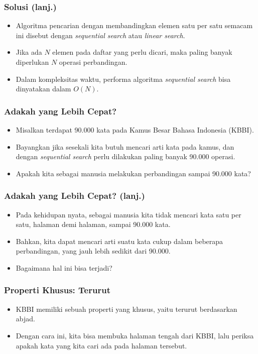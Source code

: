 \begin{frame}
\frametitle{Solusi (lanj.)}
\begin{itemize}
  \item Algoritma pencarian dengan membandingkan elemen satu per satu semacam ini disebut dengan \alert{\textit{sequential search}} atau \alert{\textit{linear search}}.
  \item Jika ada $N$ elemen pada daftar yang perlu dicari, maka paling banyak diperlukan $N$ operasi perbandingan.
  \item Dalam kompleksitas waktu, performa algoritma \textit{sequential search} bisa dinyatakan dalam $O(N)$.
\end{itemize}
\end{frame}

\begin{frame}
\frametitle{Adakah yang Lebih Cepat?}
\begin{itemize}
  \item Misalkan terdapat 90.000 kata pada Kamus Besar Bahasa Indonesia (KBBI).
  \item Bayangkan jika sesekali kita butuh mencari arti kata pada kamus, dan dengan \textit{sequential search} perlu dilakukan paling banyak 90.000 operasi.
  \item Apakah kita sebagai manusia melakukan perbandingan sampai 90.000 kata?
\end{itemize}
\end{frame}

\begin{frame}
\frametitle{Adakah yang Lebih Cepat? (lanj.)}
\begin{itemize}
  \item Pada kehidupan nyata, sebagai manusia kita tidak mencari kata satu per satu, halaman demi halaman, sampai 90.000 kata.
  \item Bahkan, kita dapat mencari arti suatu kata cukup dalam beberapa perbandingan, yang jauh lebih sedikit dari 90.000.
  \item Bagaimana hal ini bisa terjadi?
\end{itemize}
\end{frame}

\begin{frame}
\frametitle{Properti Khusus: Terurut}
\begin{itemize}
  \item KBBI memiliki sebuah properti yang khusus, yaitu \alert{terurut berdasarkan abjad}.
  \item Dengan cara ini, kita bisa membuka halaman tengah dari KBBI, lalu periksa apakah kata yang kita cari ada pada halaman tersebut.
\end{itemize}
\end{frame}

